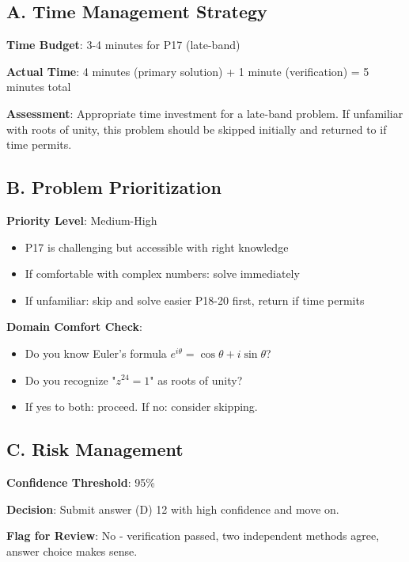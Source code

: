 \documentclass[]{article}
\begin{document}
\begin{competitionbox}
\subsection*{A. Time Management Strategy}

\textbf{Time Budget}: 3-4 minutes for P17 (late-band)

\textbf{Actual Time}: 4 minutes (primary solution) + 1 minute (verification) = 5 minutes total

\textbf{Assessment}: Appropriate time investment for a late-band problem. If unfamiliar with roots of unity, this problem should be skipped initially and returned to if time permits.

\subsection*{B. Problem Prioritization}

\textbf{Priority Level}: Medium-High
\begin{itemize}[leftmargin=*]
    \item P17 is challenging but accessible with right knowledge
    \item If comfortable with complex numbers: solve immediately
    \item If unfamiliar: skip and solve easier P18-20 first, return if time permits
\end{itemize}

\textbf{Domain Comfort Check}:
\begin{itemize}[leftmargin=*]
    \item Do you know Euler's formula $e^{i\theta} = \cos\theta + i\sin\theta$? 
    \item Do you recognize "$z^{24}=1$" as roots of unity?
    \item If yes to both: proceed. If no: consider skipping.
\end{itemize}

\subsection*{C. Risk Management}

\textbf{Confidence Threshold}: 95\%

\textbf{Decision}: Submit answer (D) 12 with high confidence and move on.

\textbf{Flag for Review}: No - verification passed, two independent methods agree, answer choice makes sense.


\end{competitionbox}
\end{document}
